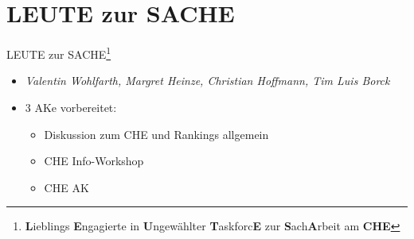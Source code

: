 \documentclass[compress, aspectratio=169]{beamer}
\begin{document}
\section{LEUTE zur SACHE}

\begin{frame}{LEUTE zur SACHE\footnote{\textbf{L}ieblings \textbf{E}ngagierte in \textbf{U}ngewählter \textbf{T}askforc\textbf{E} zur \textbf{S}ach\textbf{A}rbeit am \textbf{CHE}}}
	\begin{itemize}
		\item \emph{Valentin Wohlfarth, Margret Heinze, Christian Hoffmann, Tim Luis Borck}
		\item 3 AKe vorbereitet:
			\begin{itemize}
				\item Diskussion zum CHE und Rankings allgemein
				\item CHE Info-Workshop
				\item CHE AK
			\end{itemize}
	\end{itemize}
\end{frame}


\end{document}
